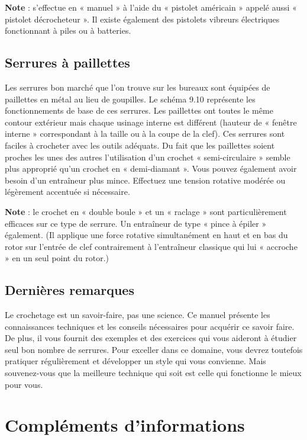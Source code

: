 \documentclass[a4paper,french,11pt,twoside]{report}
\begin{document}
\noindent \textbf{Note} : s'effectue en « manuel » à l'aide du « pistolet américain » appelé aussi « pistolet décrocheteur ». Il existe également des pistolets vibreurs électriques fonctionnant à piles ou à batteries.

\section{Serrures à paillettes}

Les serrures bon marché que l'on trouve sur les bureaux sont équipées de paillettes en métal au lieu de goupilles. Le schéma 9.10 représente les fonctionnements de base de ces serrures. Les paillettes ont toutes le même contour extérieur mais chaque usinage interne est différent (hauteur de « fenêtre  interne » correspondant à la taille ou à la coupe de la clef). Ces serrures sont faciles à crocheter avec les outils adéquats. Du fait que les paillettes soient proches les unes des autres l'utilisation d'un crochet « semi-circulaire » semble plus approprié qu'un crochet en « demi-diamant ». Vous pouvez également avoir besoin d'un entraîneur plus mince. Effectuez une tension rotative modérée ou légèrement accentuée si nécessaire.


\noindent \textbf{Note} : le crochet en « double boule » et un « raclage » sont particulièrement efficaces sur ce type de serrure.
Un entraîneur de type « pince à épiler » également. (Il applique une force rotative simultanément en haut et en bas du rotor sur l'entrée de clef contrairement à l'entraîneur classique qui lui « accroche » en un seul point du rotor.)

\section{Dernières remarques}

Le crochetage est un savoir-faire, pas une science. Ce manuel présente les connaissances techniques et les conseils nécessaires pour acquérir ce savoir faire. De plus, il vous fournit des exemples et des exercices qui vous aideront à étudier seul bon nombre de serrures. Pour exceller dans ce domaine, vous devrez toutefois pratiquer régulièrement et développer un style qui vous convienne. Mais souvenez-vous que la meilleure technique qui soit est celle qui fonctionne le mieux pour vous.

\chapter{\label{chap:complements}Compléments d'informations}
\end{document}
